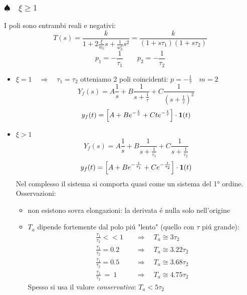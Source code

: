\documentclass[../main.tex]{subfiles}
\begin{document}
	\subsubsection{$ \spadesuit \quad \xi \geq 1 $}
		I poli sono entrambi reali e negativi:
		\[ 
			T(s) = \frac{k}{1 + 2\frac{\xi}{w_0}s  +\frac{1}{w_0^2}s^2} = \frac{k}{(1+s\tau_1)(1+s\tau_2)}
		\]
		\[ 
			p_1 = -\frac{1}{\tau_1} \qquad p_2 = -\frac{1}{\tau_2}
		\]
		\begin{itemize}
			\item 
				$ \xi = 1 \quad \Rightarrow \quad \tau_1 = \tau_2 $
				otteniamo 2 poli coincidenti: $ p = -\frac{1}{\tau} \quad m = 2 $
				\[ 
					Y_f(s) = A\frac{1}{s} + B\frac{1}{s+\frac{1}{\tau}} + C\frac{1}{(s+\frac{1}{\tau})^2} 
				\]
				\[ 
					y_f(t) = \left[ A + Be^{-\frac{t}{\tau}} + C t e^{-\frac{t}{\tau}} \right] \cdot \textbf{1}(t)
				\]
			\item 
				$ \xi > 1 $
				\[ 
					Y_f(s) = A\frac{1}{s} + B\frac{1}{s+\frac{1}{\tau_1}} + C\frac{1}{s+\frac{1}{\tau_2}} 
				\]
				\[ 
					y_f(t) = \left[ A + Be^{-\frac{t}{\tau_1}} + Ce^{-\frac{t}{\tau_2}} \right] \cdot \textbf{1}(t) 
				\]
				Nel complesso il sistema si comporta quasi come un sistema del 1° ordine.\\
				Osservazioni:
				\begin{itemize}
					\item 
						non esistono sovra elongazioni: la derivata \'e nulla solo nell'origine
					\item 
						$ T_a $ dipende fortemente dal polo pi\'u "lento" (quello con $ \tau $ pi\'u grande):
						\begin{align*}
							\frac{\tau_1}{\tau_2} << 1 \quad &\Rightarrow \quad T_a \cong 3 \tau_2
							\\
							\frac{\tau_1}{\tau_2} = 0.2 \quad &\Rightarrow \quad T_a \cong 3.22 \tau_2
							\\
							\frac{\tau_1}{\tau_2} = 0.5 \quad &\Rightarrow \quad T_a \cong 3.68 \tau_2
							\\
							\frac{\tau_1}{\tau_2}\ =\ 1 \quad &\Rightarrow \quad T_a \cong 4.75 \tau_2
						\end{align*}
						Spesso si usa il valore \textit{conservativo}: $ T_a < 5 \tau_2 $
				\end{itemize}
		\end{itemize}
\end{document}
